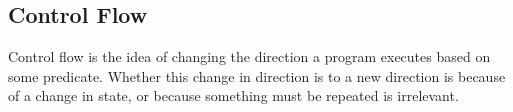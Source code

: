 \subsection{Control Flow}\label{subsec:Control_Flow}
Control flow is the idea of changing the direction a program executes based on some predicate.
Whether this change in direction is to a new direction is because of a change in state, or because something must be repeated is irrelevant.


